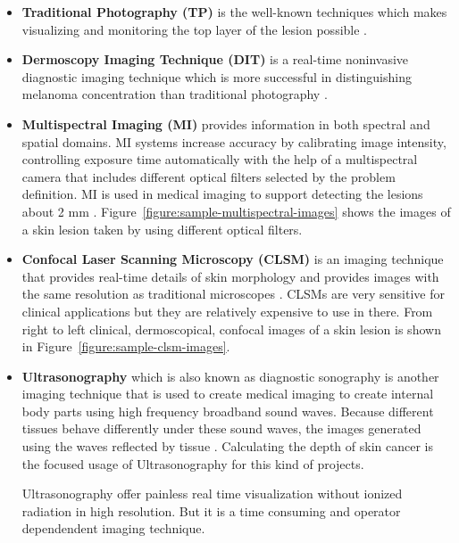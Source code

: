         \begin{itemize}

            \item \textbf{Traditional Photography (TP)} is the well-known techniques which makes visualizing and monitoring the top layer of the lesion possible \cite{feit2004melanomas}.

            \item \textbf{Dermoscopy Imaging Technique (DIT)} is a real-time noninvasive diagnostic imaging technique
                    which is more successful in distinguishing melanoma concentration than traditional photography \cite{aljanabi2019various}.

            \item \textbf{Multispectral Imaging (MI)} provides information in both spectral and spatial domains.
                    MI systems increase accuracy by calibrating image intensity,
                    controlling exposure time automatically with the help of a multispectral camera that includes different optical filters selected by the problem definition.
                    MI is used in medical imaging to support  detecting the lesions about 2 mm \cite{aljanabi2019various}.
                    Figure~\ref{figure:sample-multispectral-images} shows the images of a skin lesion taken by using different optical filters.

                    

            \item \textbf{Confocal Laser Scanning Microscopy (CLSM)} is an imaging technique that provides real-time details of skin morphology
                    and provides images with the same resolution as traditional microscopes \cite{gerger2005diagnostic}.
                    CLSMs are very sensitive for clinical applications but they are relatively expensive to use in there.
                    From right to left clinical, dermoscopical, confocal images of a skin lesion is shown in Figure~\ref{figure:sample-clsm-images}.

                    

            \item \textbf{Ultrasonography} which is also known as diagnostic sonography is another imaging technique that is used to create medical imaging to create internal body parts using high frequency broadband sound waves.
                    Because different tissues behave differently under these sound waves,  the images generated using the waves reflected by tissue \cite{sahuquillo2013study}.
                    Calculating the depth of skin cancer is the focused usage of Ultrasonography for this kind of projects.

                    Ultrasonography offer painless real time visualization without ionized radiation in high resolution.
                    But it is a time consuming and operator dependendent imaging technique.

        \end{itemize}
